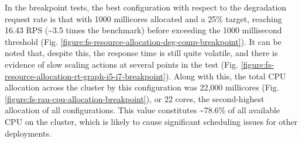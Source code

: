\noindent In the breakpoint tests, the best configuration with respect to the degradation request rate is that with 1000 millicores allocated and a 25\% target, reaching 16.43 RPS (\textasciitilde3.5 times the benchmark) before exceeding the 1000 millisecond threshold (Fig. \ref{figure:fs-resource-allocation-deg-comp-breakpoint}). It can be noted that, despite this, the response time is still quite volatile, and there is evidence of slow scaling actions at several points in the test (Fig. \ref{figure:fs-resource-allocation-rt-graph-i5-i7-breakpoint}). Along with this, the total CPU allocation across the cluster by this configuration was 22,000 millicores (Fig. \ref{figure:fs-rau-cpu-allocation-breakpoint}), or 22 cores, the second-highest allocation of all configurations. This value constitutes \textasciitilde78.6\% of all available CPU on the cluster, which is likely to cause significant scheduling issues for other deployments.

